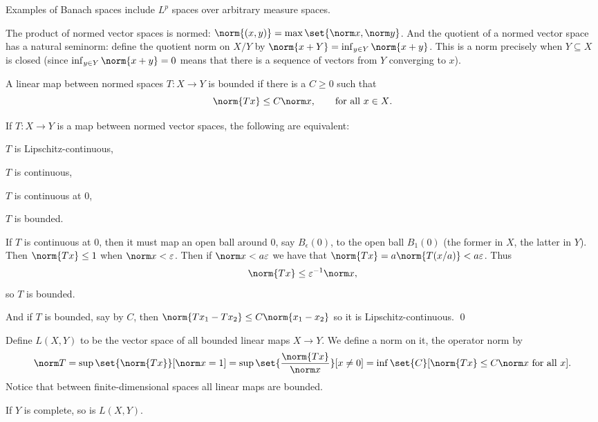 \eproof

Examples of Banach spaces include $L^p$ spaces over arbitrary measure spaces.

The product of normed vector spaces is normed: $\norm{(x,y)}=\max\set{\norm x,\norm y}$.
And the quotient of a normed vector space has a natural seminorm: define the quotient norm on $X/Y$ by $\norm{x+Y}=\inf_{y\in Y}\norm{x+y}$.
This is a norm precisely when $Y\subseteq X$ is closed (since $\inf_{y\in Y}\norm{x+y}=0$ means that there is a sequence of vectors from $Y$ converging to $x$).

A linear map between normed spaces $T\colon X\to Y$ is {\emphcolor bounded} if there is a $C\geq0$ such that
$$ \norm{Tx} \leq C\norm x,\qquad \hbox{for all $x\in X$}. $$

\bprop

    If $T\colon X\to Y$ is a map between normed vector spaces, the following are equivalent:
    \benum
        \item $T$ is Lipschitz-continuous,
        \item $T$ is continuous,
        \item $T$ is continuous at $0$,
        \item $T$ is bounded.
    \eenum

\eprop

\bproof

    If $T$ is continuous at $0$, then it must map an open ball around $0$, say $B_\epsilon(0)$, to the open ball $B_1(0)$ (the former in $X$, the latter in $Y$).
    Then $\norm{Tx}\leq1$ when $\norm x<\epsilon$.
    Then if $\norm x<a\epsilon$ we have that $\norm{Tx}=a\norm{T(x/a)}<a\epsilon$.
    Thus
    $$ \norm{Tx} \leq \epsilon^{-1}\norm x , $$
    so $T$ is bounded.

    And if $T$ is bounded, say by $C$, then $\norm{Tx_1-Tx_2}\leq C\norm{x_1-x_2}$ so it is Lipschitz-continuous.
    \qed

\eproof

Define $L(X,Y)$ to be the vector space of all bounded linear maps $X\to Y$.
We define a norm on it, the {\emphcolor operator norm} by
$$ \norm T = \sup\set{\norm{Tx}}[\norm x=1] = \sup\set{\frac{\norm{Tx}}{\norm x}}[x\neq0] = \inf\set{C}[\norm{Tx}\leq C\norm x\hbox{ for all $x$}] . $$
Notice that between finite-dimensional spaces all linear maps are bounded.

\bprop

    If $Y$ is complete, so is $L(X,Y)$.

\eprop

